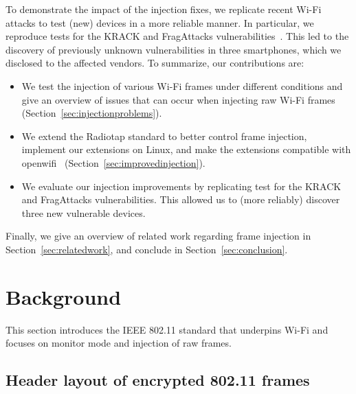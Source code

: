 \documentclass[sigconf]{acmart}
\newcommand{\wifi}{\mbox{Wi-Fi}}
\begin{document}
To demonstrate the impact of the injection fixes, we replicate recent \wifi{} attacks to test (new) devices in a more reliable manner.
In particular, we reproduce tests for the KRACK and FragAttacks vulnerabilities~\cite{vanhoef-ccs2017,vanhoef-usenix2021-fragattacks}.
This led to the discovery of previously unknown vulnerabilities in three smartphones, which we disclosed to the affected vendors.
%
To summarize, our contributions are:
\begin{itemize}
    \item We test the injection of various \wifi{} frames under different conditions and give an overview of issues that can occur when injecting raw \wifi{} frames (Section~\ref{sec:injectionproblems}).

    \item We extend the Radiotap standard to better control frame injection, implement our extensions on Linux, and make the extensions compatible with openwifi~\cite{jiao2020openwifi} (Section~\ref{sec:improvedinjection}).

    \item We evaluate our injection improvements by replicating test for the KRACK and FragAttacks vulnerabilities.
    This allowed us to (more reliably) discover three new vulnerable devices.
\end{itemize}
Finally, we give an overview of related work regarding frame injection in Section~\ref{sec:relatedwork}, and conclude in Section~\ref{sec:conclusion}.


\section{Background}

This section introduces the IEEE 802.11 standard that underpins \wifi{} and focuses on monitor mode and injection of  raw frames.

\subsection{Header layout of encrypted 802.11 frames}


\end{document}
